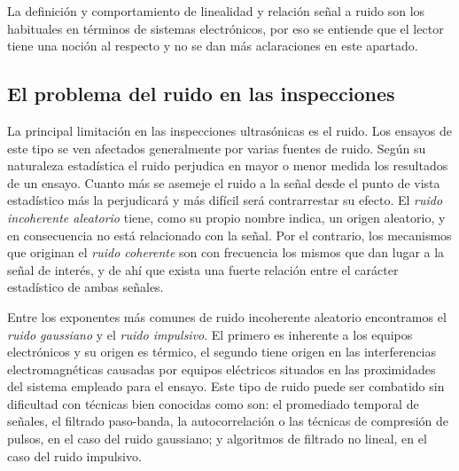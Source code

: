 La definición y comportamiento de linealidad y relación señal a ruido son los habituales en términos de sistemas electrónicos, por eso se entiende que el lector tiene una noción al respecto y no se dan más aclaraciones en este apartado.


\subsection{El problema del ruido en las inspecciones}\label{subsec:noise}

La principal limitación en las inspecciones ultrasónicas es el ruido. Los ensayos de este tipo se ven afectados generalmente por varias fuentes de ruido. Según su naturaleza estadística el ruido perjudica en mayor o menor medida los resultados de un ensayo. Cuanto más se asemeje el ruido a la señal desde el punto de vista estadístico más la perjudicará y más difícil será contrarrestar su efecto. El \emph{ruido incoherente aleatorio} tiene, como su propio nombre indica, un origen aleatorio, y en consecuencia no está relacionado con la señal. Por el contrario, los mecanismos que originan el \emph{ruido coherente} son con frecuencia los mismos que dan lugar a la señal de interés, y de ahí que exista una fuerte relación entre el carácter estadístico de ambas señales.\par
Entre los exponentes más comunes de ruido incoherente aleatorio encontramos el \emph{ruido gaussiano} y el \emph{ruido impulsivo}. El primero es inherente a los equipos electrónicos y su origen es térmico, el segundo tiene origen en las interferencias electromagnéticas causadas por equipos eléctricos situados en las proximidades del sistema empleado para el ensayo. Este tipo de ruido puede ser combatido sin dificultad con técnicas bien conocidas como son: el promediado temporal de señales, el filtrado paso-banda, la autocorrelación o las técnicas de compresión de pulsos, en el caso del ruido gaussiano; y algoritmos de filtrado no lineal, en el caso del ruido impulsivo.\par

